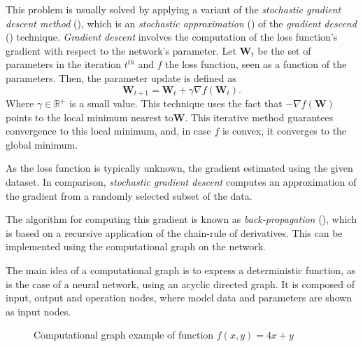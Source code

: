 This problem is usually solved by applying a variant of the \emph{stochastic gradient descent method} (\cite{kiefer1952stochastic}), which is an \emph{stochastic approximation} (\cite{Robbins2007ASA}) of the \emph{gradient descend} (\cite{cauchy1847methode}) technique. \emph{Gradient descent} involves the computation of the loss function's gradient with respect to the network's parameter. Let \(\bm{W}_{t}\) be the set of parameters in the iteration \(t^{th}\) and \(f\) the loss function, seen as a function of the parameters. Then, the parameter update is defined as
\[
  \bm{W}_{t+1} = \bm{W}_{t} + \gamma \nabla f(\bm{W}_{t}).
\]
Where \(\gamma \in \mathbb{R}^{+}\) is a small value. This technique uses the fact that \(- \nabla f(\bm{W})\) points to the local minimum nearest to\(\bm{W}\). This iterative method guarantees convergence to this local minimum, and, in case \(f\) is convex, it converges to the global minimum.

As the loss function is typically unknown, the gradient estimated using the given dataset. In comparison, \emph{stochastic gradient descent} computes an approximation of the gradient from a randomly selected subset of the data.

The algorithm for computing this gradient is known as \emph{back-propagation} (\cite{goodfellow2016deep}), which is based on a recursive application of the chain-rule of derivatives. This can be implemented using the computational graph on the network.

The main idea of a computational graph is to express a deterministic function, as is the case of a neural network, using an acyclic directed graph. It is composed of input, output and operation nodes, where model data and parameters are shown as input nodes.

\begin{figure}[H]
  \centering
  \caption{Computational graph example of function \(f(x,y) = 4x + y\) }\label{fig:cnn_cg}
\end{figure}


